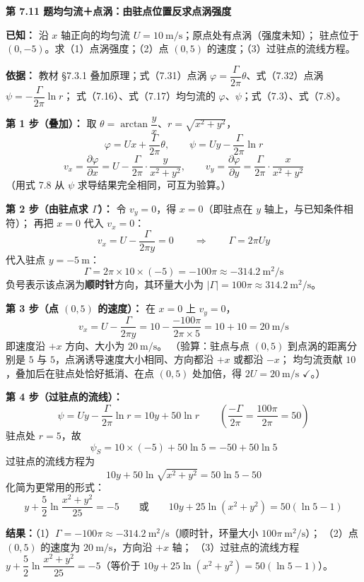 \noindent\textbf{第 7.11 题\quad 均匀流＋点涡：由驻点位置反求点涡强度}

\begin{jie}
\textbf{已知：} 沿 $x$ 轴正向的均匀流 $U=10\ \mathrm{m/s}$；原点处有点涡（强度未知）；
驻点位于 $(0,-5)$。求（1）点涡强度；（2）点 $(0,5)$ 的速度；（3）过驻点的流线方程。

\textbf{依据：} 教材 \S7.3.1 叠加原理；式（7.31）点涡 $\varphi=\dfrac{\Gamma}{2\pi}\theta$、式（7.32）点涡 $\psi=-\dfrac{\Gamma}{2\pi}\ln r$；
式（7.16）、式（7.17）均匀流的 $\varphi$、$\psi$；式（7.3）、式（7.8）。

\textbf{第 1 步（叠加）：} 取 $\theta=\arctan\dfrac{y}{x}$、$r=\sqrt{x^2+y^2}$，
\[
\varphi=Ux+\frac{\Gamma}{2\pi}\theta,\qquad \psi=Uy-\frac{\Gamma}{2\pi}\ln r
\]
\[
v_x=\frac{\partial\varphi}{\partial x}=U-\frac{\Gamma}{2\pi}\cdot\frac{y}{x^2+y^2},\qquad
v_y=\frac{\partial\varphi}{\partial y}=\frac{\Gamma}{2\pi}\cdot\frac{x}{x^2+y^2}
\]
（用式 7.8 从 $\psi$ 求导结果完全相同，可互为验算。）

\textbf{第 2 步（由驻点求 $\Gamma$）：}
令 $v_y=0$，得 $x=0$（即驻点在 $y$ 轴上，与已知条件相符）；
再把 $x=0$ 代入 $v_x=0$：
\[
v_x=U-\frac{\Gamma}{2\pi y}=0\qquad\Longrightarrow\qquad \Gamma=2\pi U y
\]
代入驻点 $y=-5\ \mathrm{m}$：
\[
\Gamma=2\pi\times 10\times(-5)=-100\pi\approx -314.2\ \mathrm{m^2/s}
\]
负号表示该点涡为\textbf{顺时针}方向，其环量大小为 $|\Gamma|=100\pi\approx 314.2\ \mathrm{m^2/s}$。

\textbf{第 3 步（点 $(0,5)$ 的速度）：} 在 $x=0$ 上 $v_y=0$，
\[
v_x=U-\frac{\Gamma}{2\pi y}=10-\frac{-100\pi}{2\pi\times 5}=10+10=20\ \mathrm{m/s}
\]
即速度沿 $+x$ 方向、大小为 $20\ \mathrm{m/s}$。
（验算：驻点与点 $(0,5)$ 到点涡的距离分别是 $5$ 与 $5$，点涡诱导速度大小相同、方向都沿 $+x$ 或都沿 $-x$；
均匀流贡献 $10$，叠加后在驻点处恰好抵消、在点 $(0,5)$ 处加倍，得 $2U=20\ \mathrm{m/s}$ $\checkmark$。）

\textbf{第 4 步（过驻点的流线）：}
\[
\psi=Uy-\frac{\Gamma}{2\pi}\ln r=10y+50\ln r\qquad\left(\frac{-\Gamma}{2\pi}=\frac{100\pi}{2\pi}=50\right)
\]
驻点处 $r=5$，故
\[
\psi_S=10\times(-5)+50\ln 5=-50+50\ln 5
\]
过驻点的流线方程为
\[
\boxed{\,10y+50\ln\sqrt{x^2+y^2}=50\ln 5-50\,}
\]
化简为更常用的形式：
\[
y+\frac{5}{2}\ln\frac{x^2+y^2}{25}=-5
\qquad\text{或}\qquad 10y+25\ln(x^2+y^2)=50(\ln 5-1)
\]

\textbf{结果：}（1）$\Gamma=-100\pi\approx -314.2\ \mathrm{m^2/s}$（顺时针，环量大小 $100\pi\ \mathrm{m^2/s}$）；
（2）点 $(0,5)$ 的速度为 $20\ \mathrm{m/s}$，方向沿 $+x$ 轴；
（3）过驻点的流线方程 $y+\dfrac{5}{2}\ln\dfrac{x^2+y^2}{25}=-5$（等价于 $10y+25\ln(x^2+y^2)=50(\ln5-1)$）。
\end{jie}

